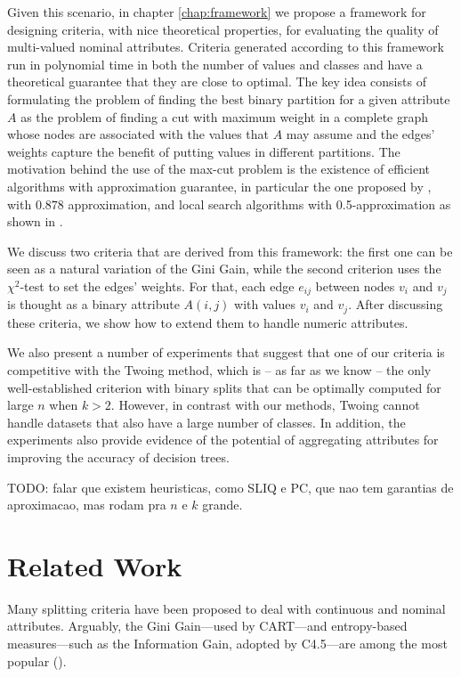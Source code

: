Given this scenario,  in chapter \ref{chap:framework} we propose
a framework for designing criteria, with nice theoretical properties, for evaluating the quality of 
 multi-valued nominal attributes.
Criteria generated according to this framework
run in polynomial time in both the number of values and classes and
have a theoretical guarantee that they are close to optimal.
The key idea consists of formulating the problem
of finding the best binary partition for a given attribute $A$ as the  problem of finding a 
cut with maximum weight  in a complete graph whose nodes are associated with the values that $A$ may assume and the edges' weights capture the benefit of putting
values in different partitions. The  motivation behind the use of the max-cut problem is 
the existence of efficient algorithms with 
approximation guarantee, in particular 
the one proposed  by \cite{GoeWil95}, with $0.878$ approximation,
and  local search  algorithms with 0.5-approximation as shown in \cite{journals/corr/AngelBPW16}.


We discuss two criteria that are derived from this framework:
the first one  can be seen as a natural variation of the
Gini Gain, while the second criterion uses the $\chi^2$-test  to set the edges' weights. For that, each
edge $e_{ij}$ between nodes  $v_i$ and $v_j$
is thought as a binary attribute $A(i,j)$ with values $v_i$ and $v_j$.
After discussing these criteria, we show how to extend them to handle
numeric attributes.

We also  present a number of experiments 
that suggest that one of our  criteria 
is  competitive with the Twoing method, which 
is -- as far as we know -- the only well-established
criterion with binary splits that can be optimally computed for large $n$ when $k > 2$.
However, in contrast with our methods, Twoing cannot handle
datasets that also have a large number of classes.
In addition, the experiments also  provide 
evidence of the potential of aggregating  attributes for improving
the accuracy of decision trees.

TODO: falar que existem heuristicas, como SLIQ e PC, que nao tem garantias de aproximacao, mas rodam pra $n$ e $k$ grande.

\section{Related Work}
\label{chap:relatedwork}

Many splitting criteria have been proposed to 
deal with continuous and nominal attributes.
Arguably, the Gini Gain---used by CART---and entropy-based measures---such as 
the Information Gain, adopted by C4.5---are among
the most popular (\cite{books/sp/datamining2005/RokachM05,
Loh2014,series/sbcs/BarrosCF15}).

